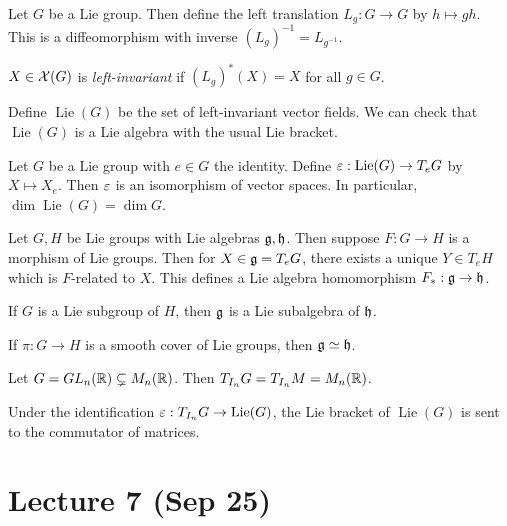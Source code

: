 \documentclass[twoside, 10pt]{article}
\begin{document}
    Let $G$ be a Lie group. Then define the left translation $L_g:G \to G$ by
    $h \mapsto gh$. This is a diffeomorphism with inverse $(L_g)^{-1} =
    L_{g^{-1}}$.

    \begin{defn} $X \in \mathcal{X}(G)$ is \textit{left-invariant} if $(L_g)^*(X) =
    X$ for all $g \in G$.  \end{defn}

    Define $\operatorname{Lie}(G)$ be the set of left-invariant vector fields.
    We can check that $\operatorname{Lie}(G)$ is a Lie algebra with the usual
    Lie bracket.

    \begin{thm} Let $G$ be a Lie group with $e \in G$ the identity. Define
    $\varepsilon: \operatorname{Lie}(G) \to T_e G$ by $X \mapsto X_e$. Then $\varepsilon$ is an
isomorphism of vector spaces. In particular, $\dim \operatorname{Lie}(G) = \dim
G$.  \end{thm}

    \begin{thm} Let $G,H$ be Lie groups with Lie algebras $\mathfrak{g}, \mathfrak{h}$.
        Then suppose $F: G \to H$ is a morphism of Lie groups. Then for $X \in
        \mathfrak{g} = T_{e}G$, there exists a unique $Y \in T_eH$ which is
        $F$-related to $X$. This defines a Lie algebra homomorphism $F_*:
        \mathfrak{g} \to \mathfrak{h}$.  \end{thm}

    \begin{cor} If $G$ is a Lie subgroup of $H$, then $\mathfrak{g}$ is a Lie
    subalgebra of $\mathfrak{h}$.  \end{cor}

    \begin{cor} If $\pi:G \to H$ is a smooth cover of Lie groups, then $\mathfrak{g}
    \simeq \mathfrak{h}$.  \end{cor}

    \begin{exm} Let $G = GL_n(\mathbb{R}) \subsetneq M_n(\mathbb{R})$. Then $T_{I_n}G =
    T_{I_n}M = M_n(\mathbb{R})$.  \end{exm}

    \begin{prop} Under the identification $\varepsilon: T_{I_n}G \to
    \operatorname{Lie}(G)$, the Lie bracket of $\operatorname{Lie}(G)$ is sent
to the commutator of matrices.  \end{prop}

    \section{Lecture 7 (Sep 25)}%
    
\end{document}
